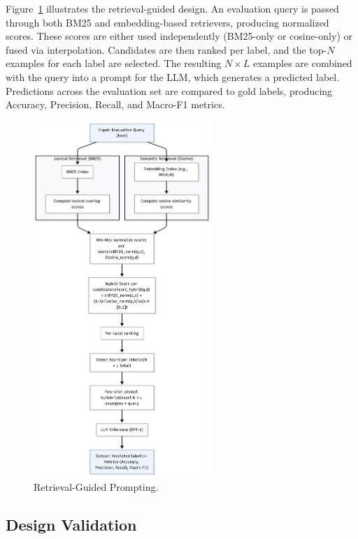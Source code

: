 Figure~\ref{fig:retrieval-pipeline} illustrates the retrieval-guided design. 
An evaluation query is passed through both BM25 and embedding-based retrievers, producing normalized scores. 
These scores are either used independently (BM25-only or cosine-only) or fused via interpolation. 
Candidates are then ranked per label, and the top-$N$ examples for each label are selected. 
The resulting $N \times L$ examples are combined with the query into a prompt for the LLM, which generates a predicted label. 
Predictions across the evaluation set are compared to gold labels, producing Accuracy, Precision, Recall, and Macro-F1 metrics.  

\begin{figure}[!htbp]
  \centering
  \includegraphics[width=0.6\textwidth]{Images/Iteration3_RetrievalPipeline.png}
  \caption{Retrieval-Guided Prompting.}
  \label{fig:retrieval-pipeline}
\end{figure}

\subsection{Design Validation}

